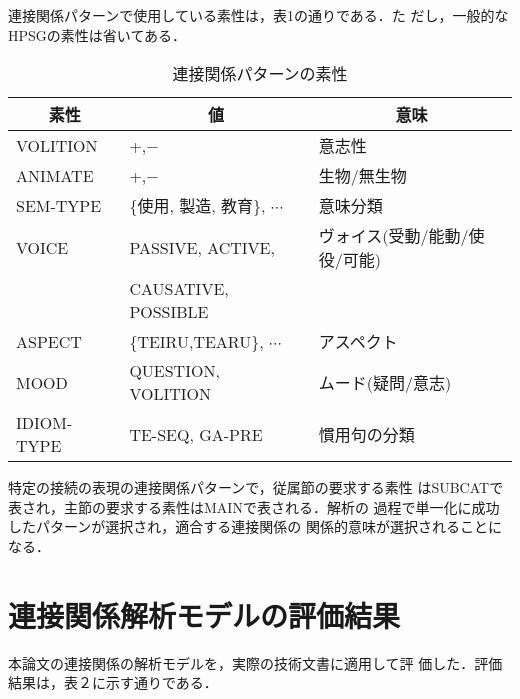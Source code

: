 \newpage
連接関係パターンで使用している素性は，表1の通りである．た
だし，一般的なHPSGの素性は省いてある．

\begin{table}[htbp]
  \begin{center}
    \caption{連接関係パターンの素性}
    \label{tab:1}

    \smallskip

    \begin{tabular}{|l|l|l|} \hline
      \multicolumn{1}{|c}{素性} & 
      \multicolumn{1}{|c}{値}   &
      \multicolumn{1}{|c|}{意味} \\ \hline
      VOLITION   & +,$-$ & 意志性 \\
      ANIMATE    & +,$-$ & 生物/無生物 \\
      SEM-TYPE   & \{使用, 製造, 教育\}, $\cdots$ & 意味分類 \\
      VOICE      & PASSIVE, ACTIVE, & ヴォイス(受動/能動/使役/可能) \\
      & CAUSATIVE, POSSIBLE & \\
      ASPECT     & \{TEIRU,TEARU\}, $\cdots$ & アスペクト \\
      MOOD       & QUESTION, VOLITION & ムード(疑問/意志) \\
      IDIOM-TYPE & TE-SEQ, GA-PRE & 慣用句の分類 \\ \hline
    \end{tabular}
  \end{center}
\end{table}

特定の接続の表現の連接関係パターンで，従属節の要求する素性
はSUBCATで表され，主節の要求する素性はMAINで表される．解析の
過程で単一化に成功したパターンが選択され，適合する連接関係の
関係的意味が選択されることになる．

\section{連接関係解析モデルの評価結果}\label{section:evaluation}
本論文の連接関係の解析モデルを，実際の技術文書に適用して評
価した．評価結果は，表２に示す通りである．

